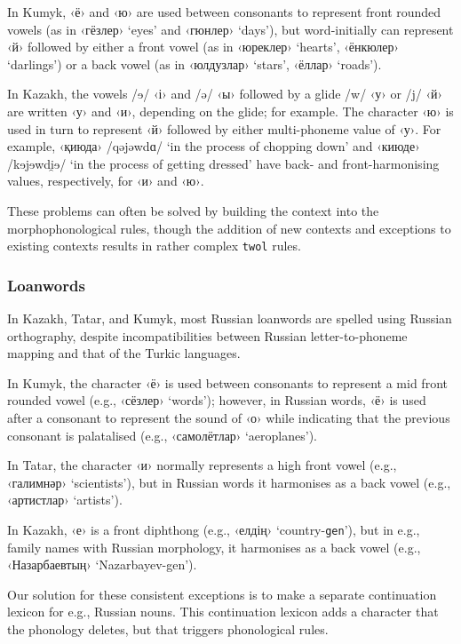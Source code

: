 \documentclass[a4paper,11pt,twocolumn]{article}
\newcommand{\gmk}[1]{{\qgmk #1}}
\newcommand{\tags}[1]{\texttt{#1}}
\begin{document}
In Kumyk, ‹ё› and ‹ю› are used between consonants to represent front rounded vowels (as in ‹гёзлер› `eyes' and ‹гюнлер› `days'), but word-initially can represent ‹й› followed by either a front vowel (as in ‹юреклер› `hearts', ‹ёнкюлер› `darlings') or a back vowel (as in ‹юлдузлар› `stars', ‹ёллар› `roads').

In Kazakh, the vowels /{\qipa ɘ}/ ‹і› and /ə/ ‹ы› followed by a glide /w/ ‹у› or /j/ ‹й› are written ‹у› and ‹и›, depending on the glide; for example.  The character ‹ю› is used in turn to represent ‹й› followed by either multi-phoneme value of ‹у›.  For example, ‹қиюда› /qəjəwd{\qipa ɑ}/ `in the process of chopping down' and ‹киюде› /k{\qipa ɘ}j{\qipa ɘ}wd{\qipa i̯ɘ}/ `in the process of getting dressed' have back- and front-harmonising values, respectively, for ‹и› and ‹ю›.

These problems can often be solved by building the context into the morphophonological rules, though the addition of new contexts and exceptions to existing contexts results in rather complex \texttt{twol} rules.

\subsubsection{Loanwords}
In Kazakh, Tatar, and Kumyk, most Russian loanwords are spelled using Russian orthography, despite incompatibilities between Russian letter-to-phoneme mapping and that of the Turkic languages.

In Kumyk, the character ‹ё› is used between consonants to represent a mid front rounded vowel (e.g., ‹сёзлер› `words'); however, in Russian words, ‹ё› is used after a consonant to represent the sound of ‹о› while indicating that the previous consonant is palatalised (e.g., ‹самолётлар› `aeroplanes').

In Tatar, the character ‹и› normally represents a high front vowel (e.g., ‹галимнәр› `scientists'), but in Russian words it harmonises as a back vowel (e.g., ‹артистлар› `artists').

In Kazakh, ‹е› is a front diphthong (e.g., ‹елдің› `country-\tags{gen}'), but in e.g., family names with Russian morphology, it harmonises as a back vowel (e.g., ‹Назарбаевтың› `Nazarbayev-\gmk{gen}').

Our solution for these consistent exceptions is to make a separate continuation lexicon for e.g., Russian nouns.  This continuation lexicon adds a character that the phonology deletes, but that triggers phonological rules.
\end{document}
